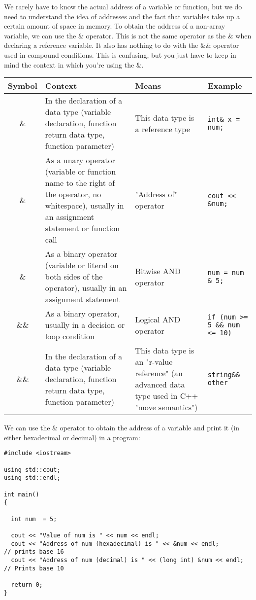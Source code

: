 \documentclass{report}
\begin{document}
\noindent We rarely have to know the actual address of a variable or function, but we do need to understand the idea of addresses and the fact that variables take up a certain amount of space in memory.
\bigbreak \noindent
To obtain the address of a non-array variable, we can use the \& operator.
\bigbreak \noindent
This is not the same operator as the \& when declaring a reference variable. It also has nothing to do with the \&\& operator used in compound conditions. This is confusing, but you just have to keep in mind the context in which you're using the \&.
\bigbreak \noindent \bigbreak \noindent \bigbreak \noindent
\begin{tabularx}{\textwidth}{|c|X|X|X|}
\hline
\textbf{Symbol} & \textbf{Context} & \textbf{Means} & \textbf{Example} \\
\hline
\& & In the declaration of a data type (variable declaration, function return data type, function parameter) & This data type is a reference type & \texttt{int\& x = num;} \\
\hline
\& & As a unary operator (variable or function name to the right of the operator, no whitespace), usually in an assignment statement or function call & "Address of" operator & \texttt{cout << \&num;} \\
\hline
\& & As a binary operator (variable or literal on both sides of the operator), usually in an assignment statement & Bitwise AND operator & \texttt{num = num \& 5;} \\
\hline
\&\& & As a binary operator, usually in a decision or loop condition & Logical AND operator & \texttt{if (num >= 5 \&\& num <= 10)} \\
\hline
\&\& & In the declaration of a data type (variable declaration, function return data type, function parameter) & This data type is an "r-value reference" (an advanced data type used in C++ "move semantics") & \texttt{string\&\& other} \\
\hline
\end{tabularx}
\newpage
\noindent We can use the \& operator to obtain the address of a variable and print it (in either hexadecimal or decimal) in a program:
\begin{mdframed}
  \begin{verbatim}
#include <iostream>

using std::cout;
using std::endl;

int main()
{
  
  int num  = 5;

  cout << "Value of num is " << num << endl;          
  cout << "Address of num (hexadecimal) is " << &num << endl;         // prints base 16
  cout << "Address of num (decimal) is " << (long int) &num << endl;  // Prints base 10

  return 0;
}
\end{verbatim}
\end{mdframed}
\end{document}
